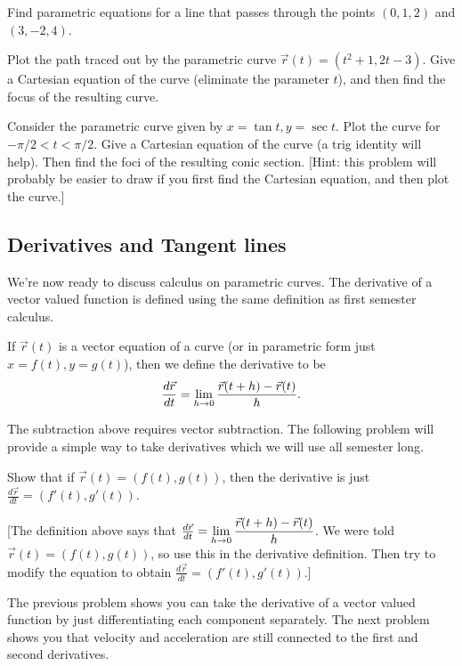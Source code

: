 \begin{problem}\label{line equation to refer to}    
Find parametric equations for a line that passes through the points $(0,1,2)$ and $(3,-2,4)$.
\end{problem}

\begin{problem}
Plot the path traced out by the parametric curve $\vec r(t)= (t^2+1, 2t-3).$ Give a Cartesian equation of the curve (eliminate the parameter $t$), and then find the focus of the resulting curve.
\end{problem}

\begin{problem}
Consider the parametric curve given by $x=\tan t, y=\sec t$. Plot the curve for $-\pi/2<t<\pi/2$. Give a Cartesian equation of the curve (a trig identity will help).  Then find the foci of the resulting conic section. [Hint: this problem will probably be easier to draw if you first find the Cartesian equation, and then plot the curve.]
\end{problem}

\subsection{Derivatives and Tangent lines}\label{derivatives and tangent lines}
We're now ready to discuss calculus on parametric curves. The derivative of a vector valued function is defined using the same definition as first semester calculus.

\begin{definition}
If $\vec r(t)$ is a vector equation of a curve (or in parametric form just $x=f(t), y=g(t)$), then we define the derivative to be $$\frac{d\vec r}{dt}=\displaystyle\lim_{h\to 0}\frac{\vec r(t+h)-\vec r(t)}{h}.$$
\end{definition}
The subtraction above requires vector subtraction.  The following problem will provide a simple way to take derivatives which we will use all semester long.

\begin{problem} 
%
Show that if $\vec r(t) = (f(t),g(t))$, then the derivative is just $\frac{d\vec r}{dt} = (f'(t),g'(t))$.  

[The definition above says that $\frac{d\vec r}{dt}=\displaystyle\lim_{h\to 0}\frac{\vec r(t+h)-\vec r(t)}{h}$. We were told $\vec r(t) = (f(t),g(t))$, so use this in the derivative definition.  Then try to modify the equation to obtain $\frac{d\vec r}{dt} = (f'(t),g'(t))$.]
\end{problem}
The previous problem shows you can take the derivative of a vector valued function by just differentiating each component separately. The next problem shows you that velocity and acceleration are still connected to the first and second derivatives. 

